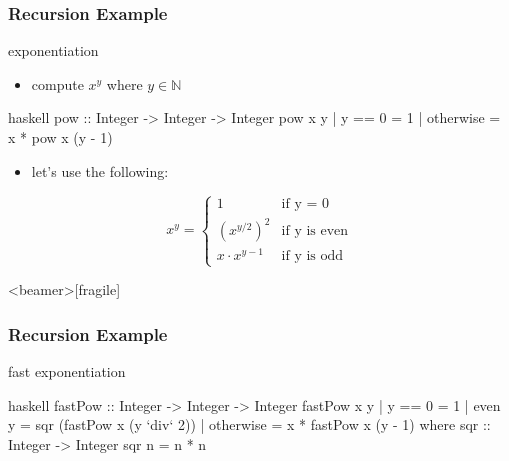 \documentclass[dvipsnames]{beamer}
\theoremstyle{plain}
\begin{document}
\begin{frame}[fragile]
  \frametitle{Recursion Example}

  \begin{exampleblock}{exponentiation}
    \begin{itemize}
      \item compute $x^y$ where $y \in \mathbb{N}$
    \end{itemize}

    \smallskip
    \begin{pygments}{haskell}
pow :: Integer -> Integer -> Integer
pow x y
  | y == 0    = 1
  | otherwise = x * pow x (y - 1)
    \end{pygments}

    \pause
    \begin{itemize}
      \item let's use the following:
    \end{itemize}
    \[
      x^y =
        \begin{cases}
          1               & \mbox{if y = 0}\\
          {(x^{y/2})}^2   & \mbox{if y is even}\\
          x \cdot x^{y-1} & \mbox{if y is odd}
        \end{cases}
    \]
  \end{exampleblock}
\end{frame}

\begin{frame}<beamer>[fragile]
  \frametitle{Recursion Example}

  \begin{exampleblock}{fast exponentiation}
    \begin{pygments}{haskell}
fastPow :: Integer -> Integer -> Integer
fastPow x y
  | y == 0    = 1
  | even y    = sqr (fastPow x (y `div` 2))
  | otherwise = x * fastPow x (y - 1)
  where
    sqr :: Integer -> Integer
    sqr n = n * n
    \end{pygments}
  \end{exampleblock}
\end{frame}
\end{document}
